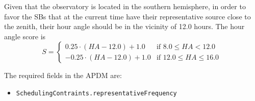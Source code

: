 \documentclass{article}
\begin{document}
Given that the observatory is located in the southern hemisphere, in order to favor the
SBs that at the current time have their representative source close to the zenith, 
their hour angle should be in the vicinity of 12.0 hours. The hour angle score is
$$
   S = \left\{ \begin{array}{ll}
                0.25\cdot (HA - 12.0) + 1.0 & \text{if $8.0 \leq HA < 12.0$} \\
               -0.25\cdot (HA - 12.0) + 1.0 & \text{if $12.0 \leq HA \leq 16.0$}
               \end{array}
       \right . \
$$

The required fields in the APDM are:
\begin{itemize}
\item {\tt SchedulingContraints.representativeFrequency}
\end{itemize}
\end{document}

